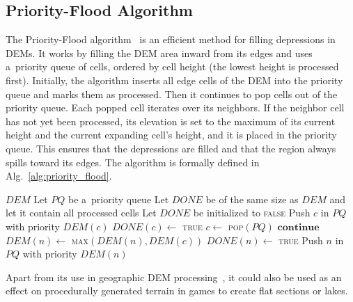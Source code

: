 \subsection{Priority-Flood Algorithm}\label{priority_flood}
The Priority-Flood algorithm~\cite{priority_flood_barnes} is an efficient method for filling depressions in DEMs. It works by filling the DEM area inward from its edges and uses a~priority queue of cells, ordered by cell height (the lowest height is processed first). Initially, the algorithm inserts all edge cells of the DEM into the priority queue and marks them as processed. Then it continues to pop cells out of the priority queue. Each popped cell iterates over its neighbors. If the neighbor cell has not yet been processed, its elevation is set to the maximum of its current height and the current expanding cell's height, and it is placed in the priority queue. This ensures that the depressions are filled and that the region always spills toward its edges. The algorithm is formally defined in Alg.~\ref{alg:priority_flood}.



\begin{algorithm}
\caption{Priority-Flood~\cite{priority_flood_barnes}}\label{alg:priority_flood}
\begin{algorithmic}[1]
\Require $\mathit{DEM}$
\State Let $\mathit{PQ}$ be a~priority queue
\State Let $\mathit{DONE}$ be of the same size as $\mathit{DEM}$ and let it contain all processed cells
\State Let $\mathit{DONE}$ be initialized to \textsc{false}
\State Push $c$ in $\mathit{PQ}$ with priority $\mathit{DEM}\left(c\right)$
\State $\mathit{DONE}\left(c\right) \gets$ \textsc{true}
\EndFor
{}
\State $c \gets$ \textsc{pop}$\left(\mathit{PQ}\right)$
\State $\mathbf{continue}$
\EndIf
\State $\mathit{DEM}\left(n\right) \gets$ \textsc{max}$\left(\mathit{DEM}\left(n\right), \mathit{DEM}\left(c\right)\right)$
\State $\mathit{DONE}\left(n\right) \gets$ \textsc{true}
\State Push $n$ in $\mathit{PQ}$ with priority $\mathit{DEM}\left(n\right)$
\EndFor
\EndWhile

\end{algorithmic}
\end{algorithm}


Apart from its use in geographic DEM processing~\cite{priority_flood_barnes}, it could also be used as an effect on procedurally generated terrain in games to create flat sections or lakes.

